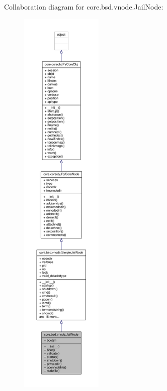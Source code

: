 Collaboration diagram for core.\+bsd.\+vnode.\+Jail\+Node\+:
\nopagebreak
\begin{figure}[H]
\begin{center}
\leavevmode
\includegraphics[height=550pt]{classcore_1_1bsd_1_1vnode_1_1_jail_node__coll__graph}
\end{center}
\end{figure}
